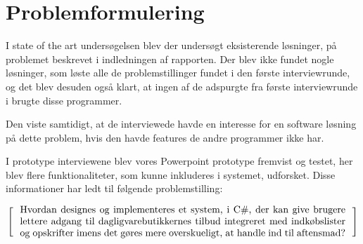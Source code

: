 \section{Problemformulering}\label{section:problemformulering}

I state of the art undersøgelsen  blev der undersøgt eksisterende løsninger, på problemet beskrevet i indledningen af rapporten. 
Der blev ikke fundet nogle løsninger, som løste alle de problemstillinger fundet i den første interviewrunde, og det blev desuden også klart, at ingen af de adspurgte fra første interviewrunde i  brugte disse programmer.

Den viste samtidigt, at de interviewede havde en interesse for en software løsning på dette problem, hvis den havde features de andre programmer ikke har. 

I prototype interviewene blev vores Powerpoint prototype fremvist og testet, her blev flere funktionaliteter, som kunne inkluderes i systemet, udforsket.
Disse informationer har ledt til følgende problemstilling:

\[
  \left[
  \begin{minipage}{\textwidth}
  \centering
  \begin{minipage}{0.96\textwidth}
  Hvordan designes og implementeres et system, i C\#, der kan give brugere lettere adgang til dagligvarebutikkernes tilbud integreret med indkøbslister og opskrifter imens det gøres mere overskueligt, at handle ind til aftensmad?
  \end{minipage} 
  \end{minipage}                           
    \right]
\]